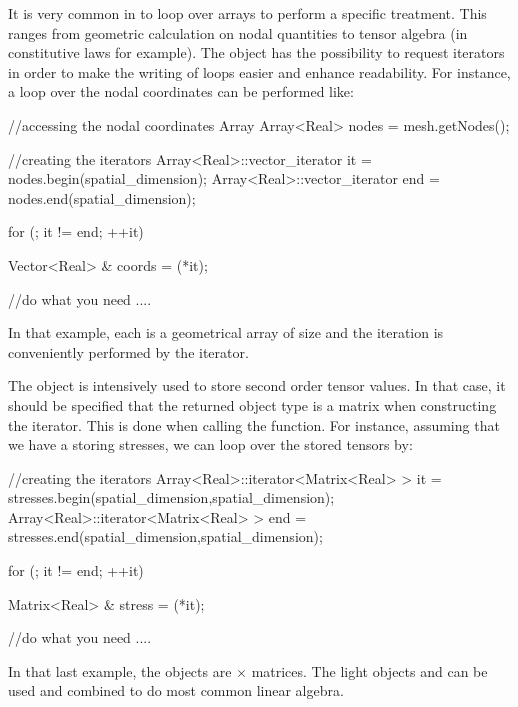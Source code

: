 It is very common in \akantu to loop over arrays to perform a specific
treatment. This ranges from geometric calculation on nodal quantities
to tensor algebra (in constitutive laws for example).
The  object has the possibility to request iterators
in order to make the writing of loops easier and enhance readability.
For instance, a loop over the nodal coordinates can be performed like:
\begin{cpp}
  //accessing the nodal coordinates Array
  Array<Real> nodes = mesh.getNodes();

  //creating the iterators
  Array<Real>::vector_iterator it  = nodes.begin(spatial_dimension);
  Array<Real>::vector_iterator end = nodes.end(spatial_dimension);

  for (; it != end; ++it){
    Vector<Real> & coords = (*it);

    //do what you need
    ....

  }
\end{cpp}
In that example, each  is a geometrical array of
size  and the iteration is conveniently
performed by the  iterator.

The  object is intensively used to store second order
tensor values.  In that case, it should be specified that the returned
object type is a matrix when constructing the iterator. This is done
when calling the  function. For instance, assuming that we
have a  storing stresses, we can loop over the stored
tensors by:

\begin{cpp}
  //creating the iterators
  Array<Real>::iterator<Matrix<Real> > it  = stresses.begin(spatial_dimension,spatial_dimension);
  Array<Real>::iterator<Matrix<Real> > end = stresses.end(spatial_dimension,spatial_dimension);

  for (; it != end; ++it){
    Matrix<Real> & stress = (*it);

    //do what you need
    ....

  }
\end{cpp}
In that last example, the  objects are
 $\times$  matrices.
The light objects  and  can be used and
combined to do most common linear algebra.


